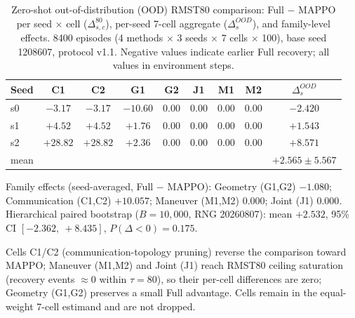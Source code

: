 \begin{table}[t]
\centering
\small
\caption{Zero-shot out-of-distribution (OOD) RMST80 comparison: Full $-$ MAPPO per seed $\times$ cell
($\Delta^{80}_{s,c}$), per-seed 7-cell aggregate ($\Delta^{OOD}_s$), and family-level effects.
8400 episodes (4 methods $\times$ 3 seeds $\times$ 7 cells $\times$ 100), base seed 1208607, protocol v1.1.
Negative values indicate earlier Full recovery; all values in environment steps.}
\label{tab:ood}
\begin{tabular}{lccccccc|c}
\toprule
Seed & C1 & C2 & G1 & G2 & J1 & M1 & M2 & $\Delta^{OOD}_s$ \\
\midrule
s0 & $-3.17$ & $-3.17$ & $-10.60$ & $0.00$ & $0.00$ & $0.00$ & $0.00$ & $-2.420$ \\
s1 & $+4.52$ & $+4.52$ & $+1.76$ & $0.00$ & $0.00$ & $0.00$ & $0.00$ & $+1.543$ \\
s2 & $+28.82$ & $+28.82$ & $+2.36$ & $0.00$ & $0.00$ & $0.00$ & $0.00$ & $+8.571$ \\
\midrule
mean & & & & & & & & $+2.565 \pm 5.567$ \\
\bottomrule
\end{tabular}

\vspace{2mm}
\small
Family effects (seed-averaged, Full $-$ MAPPO): Geometry (G1,G2) $-1.080$;
Communication (C1,C2) $+10.057$; Maneuver (M1,M2) $0.000$; Joint (J1) $0.000$.
Hierarchical paired bootstrap ($B=10{,}000$, RNG 20260807): mean $+2.532$,
95\% CI $[-2.362,\ +8.435]$, $P(\Delta<0)=0.175$.

\vspace{1mm}
\footnotesize
Cells C1/C2 (communication-topology pruning) reverse the comparison toward MAPPO;
Maneuver (M1,M2) and Joint (J1) reach RMST80 ceiling saturation (recovery events
$\approx 0$ within $\tau=80$), so their per-cell differences are zero; Geometry
(G1,G2) preserves a small Full advantage. Cells remain in the equal-weight
7-cell estimand and are not dropped.
\end{table}
